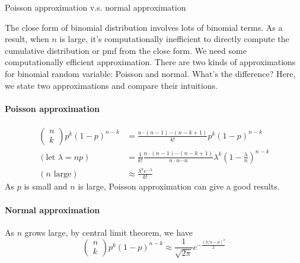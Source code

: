 \documentclass[11pt]{article}
\begin{document}
\begin{remark}{Poisson approximation v.s. normal approximation}

The close form of binomial distribution involves lots of binomial terms. As a result, when $n$ is large, it's computationally inefficient to directly compute the cumulative distribution or pmf from the close form. We need some computationally efficient approximation.
There are two kinds of approximations for binomial random variable: Poisson and normal. What's the difference? Here, we state two approximations and compare their intuitions.
\paragraph{Poisson approximation}
\begin{align*}
\left(\begin{array}{c}
n\\
k
\end{array}\right)p^k(1-p)^{n-k} &= \frac{n\cdot(n-1)\cdots(n-k+1)}{k!}p^k(1-p)^{n-k}\\
(\mbox{let $\lambda=np$})&=\frac{1}{k!}\frac{n\cdot(n-1)\cdots(n-k+1)}{n\cdot n\cdots n}\lambda^k(1-\frac{\lambda}{n})^{n-k}\\
(\mbox{$n$ large})&\approx \frac{\lambda^ke^{-\lambda}}{k!}
\end{align*}
As $p$ is small and $n$ is large, Poisson approximation can give a good results.
\paragraph{Normal approximation}
As $n$ grows large, by central limit theorem, we have
$$\left(\begin{array}{c}
n\\
k
\end{array}\right)p^k(1-p)^{n-k}\approx\frac{1}{\sqrt{2\pi}}e^{-\frac{(k/n-p)^2}{2}}$$
\end{remark}
\end{document}
